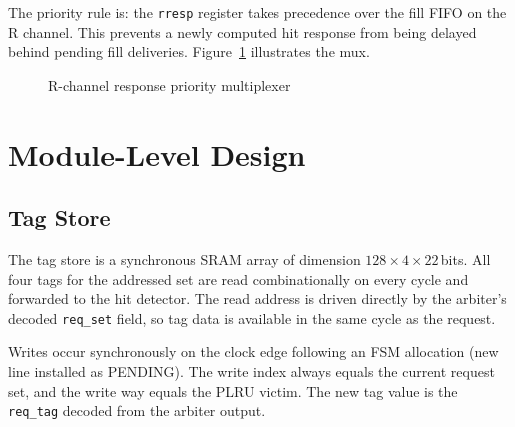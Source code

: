 \documentclass[12pt,letterpaper]{report}
\begin{document}
The priority rule is: the \texttt{rresp} register takes precedence
over the fill FIFO on the R channel.  This prevents a newly computed
hit response from being delayed behind pending fill deliveries.
Figure~\ref{fig:resp_mux} illustrates the mux.

\begin{figure}[h]
\centering
{}
\caption{R-channel response priority multiplexer}
\label{fig:resp_mux}
\end{figure}

\chapter{Module-Level Design}
\label{ch:design}

\section{Tag Store}

The tag store is a synchronous SRAM array of dimension
$128 \times 4 \times 22$\,bits.  All four tags for the addressed set
are read combinationally on every cycle and forwarded to the hit
detector.  The read address is driven directly by the arbiter's decoded
\texttt{req\_set} field, so tag data is available in the same cycle as
the request.

Writes occur synchronously on the clock edge following an FSM
allocation (new line installed as PENDING).  The write index always
equals the current request set, and the write way equals the PLRU
victim.  The new tag value is the \texttt{req\_tag} decoded from the
arbiter output.
\end{document}
